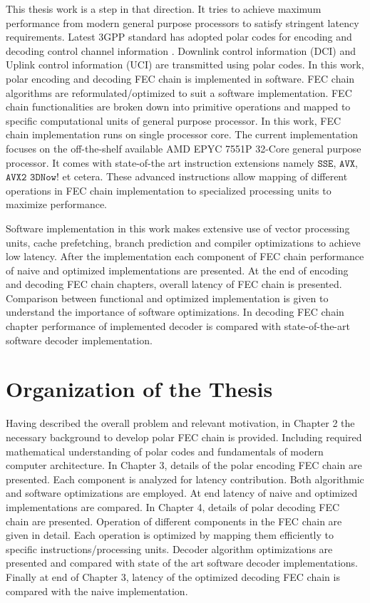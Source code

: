 This thesis work is a step in that direction. It tries to achieve maximum performance from modern general purpose processors to satisfy stringent latency requirements. Latest 3GPP standard has adopted polar codes for encoding and decoding control channel information \cite{3gpp.38.212}. Downlink control information (DCI) and Uplink control information (UCI) are transmitted using polar codes. In this work, polar encoding and decoding FEC chain is implemented in software. FEC chain algorithms are reformulated/optimized to suit a software implementation. FEC chain functionalities are broken down into primitive operations and mapped to specific computational units of general purpose processor. In this work, FEC chain implementation runs on single processor core. The current implementation focuses on the off-the-shelf available AMD EPYC 7551P 32-Core general purpose processor\cite{amdEpyc}. It comes with state-of-the art instruction extensions namely $\mathtt{SSE}$, $\mathtt{AVX}$, $\mathtt{AVX2}$ $\mathtt{3DNow!}$ et cetera. These advanced instructions allow mapping of different operations in FEC chain implementation to specialized processing units to maximize performance. 

Software implementation in this work makes extensive use of vector processing units, cache prefetching, branch prediction and compiler optimizations to achieve low latency. After the implementation each component of FEC chain performance of naive and optimized implementations are presented. At the end of encoding and decoding FEC chain chapters, overall latency of FEC chain  is presented. Comparison between functional and optimized implementation is given to understand the importance of software optimizations. In decoding FEC chain chapter performance of implemented decoder is compared with state-of-the-art software decoder implementation\cite{lowLatencySWPolarDec}.

\section*{Organization of the Thesis}
Having described the overall problem and relevant motivation, in Chapter 2 the necessary background to develop polar FEC chain is provided. Including required mathematical understanding of polar codes and fundamentals of modern computer architecture. In Chapter 3, details of the polar encoding FEC chain are presented. Each component is analyzed for latency contribution. Both algorithmic and software optimizations are employed. At end latency of naive and optimized implementations are compared. In Chapter 4, details of polar decoding FEC chain are presented. Operation of different components in the FEC chain are given in detail. Each operation is optimized by mapping them efficiently to specific instructions/processing units. Decoder algorithm optimizations are presented and compared with state of the art software decoder implementations. Finally at end of Chapter 3, latency of the optimized decoding FEC chain is compared with the naive implementation.